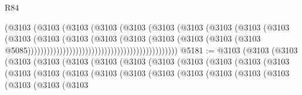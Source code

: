 \begin{lexlean}{R84}
\begin{coremodule}
                                                            (@3103
                                                              (@3103
                                                                (@3103
                                                                  (@3103
                                                                    (@3103
                                                                      (@3103
                                                                        (@3103
                                                                          (@3103
                                                                            (@3103
                                                                              (@3103
                                                                                (@3103
                                                                                  (@3103
                                                                                    (@3103
                                                                                      (@3103
                                                                                        (@3103
                                                                                          (@3103
                                                                                            (@3103
                                                                                              (@3103
                                                                                                (@3103
                                                                                                  @5085)))))))))))))))))))))))))))))))))))))))))))))))
@5181 := @3103
    (@3103
      (@3103
        (@3103
          (@3103
            (@3103
              (@3103
                (@3103
                  (@3103
                    (@3103
                      (@3103
                        (@3103
                          (@3103
                            (@3103
                              (@3103
                                (@3103
                                  (@3103
                                    (@3103
                                      (@3103
                                        (@3103
                                          (@3103
                                            (@3103
                                              (@3103
                                                (@3103
                                                  (@3103
                                                    (@3103

\end{coremodule}
\end{lexlean}
